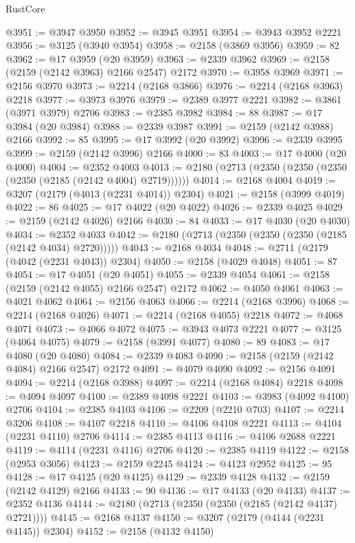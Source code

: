 \begin{lexlean}{RustCore}
\begin{coremodule}
@3951 := @3947 @3950
@3952 := @3945 @3951
@3954 := @3943 @3952 @2221
@3956 := @3125 (@3940 @3954)
@3958 := @2158 (@3869 @3956)
@3959 := 82
@3962 := @17 @3959 (@20 @3959)
@3963 := @2339 @3962
@3969 := @2158 (@2159 (@2142 @3963) @2166 @2547) @2172
@3970 := @3958 @3969
@3971 := @2156 @3970
@3973 := @2214 (@2168 @3866)
@3976 := @2214 (@2168 @3963) @2218
@3977 := @3973 @3976
@3979 := @2389 @3977 @2221
@3982 := @3861 (@3971 @3979) @2706
@3983 := @2385 @3982
@3984 := 88
@3987 := @17 @3984 (@20 @3984)
@3988 := @2339 @3987
@3991 := @2159 (@2142 @3988) @2166
@3992 := 85
@3995 := @17 @3992 (@20 @3992)
@3996 := @2339 @3995
@3999 := @2159 (@2142 @3996) @2166
@4000 := 83
@4003 := @17 @4000 (@20 @4000)
@4004 := @2352 @4003
@4013 := @2180 (@2713 (@2350 (@2350 (@2350 (@2350 (@2185 (@2142 @4004) @2719))))))
@4014 := @2168 @4004
@4019 := @3207 (@2179 (@4013 (@2231 @4014)) @2304)
@4021 := @2158 (@3999 @4019)
@4022 := 86
@4025 := @17 @4022 (@20 @4022)
@4026 := @2339 @4025
@4029 := @2159 (@2142 @4026) @2166
@4030 := 84
@4033 := @17 @4030 (@20 @4030)
@4034 := @2352 @4033
@4042 := @2180 (@2713 (@2350 (@2350 (@2350 (@2185 (@2142 @4034) @2720)))))
@4043 := @2168 @4034
@4048 := @2711 (@2179 (@4042 (@2231 @4043)) @2304)
@4050 := @2158 (@4029 @4048)
@4051 := 87
@4054 := @17 @4051 (@20 @4051)
@4055 := @2339 @4054
@4061 := @2158 (@2159 (@2142 @4055) @2166 @2547) @2172
@4062 := @4050 @4061
@4063 := @4021 @4062
@4064 := @2156 @4063
@4066 := @2214 (@2168 @3996)
@4068 := @2214 (@2168 @4026)
@4071 := @2214 (@2168 @4055) @2218
@4072 := @4068 @4071
@4073 := @4066 @4072
@4075 := @3943 @4073 @2221
@4077 := @3125 (@4064 @4075)
@4079 := @2158 (@3991 @4077)
@4080 := 89
@4083 := @17 @4080 (@20 @4080)
@4084 := @2339 @4083
@4090 := @2158 (@2159 (@2142 @4084) @2166 @2547) @2172
@4091 := @4079 @4090
@4092 := @2156 @4091
@4094 := @2214 (@2168 @3988)
@4097 := @2214 (@2168 @4084) @2218
@4098 := @4094 @4097
@4100 := @2389 @4098 @2221
@4103 := @3983 (@4092 @4100) @2706
@4104 := @2385 @4103
@4106 := @2209 (@2210 @703)
@4107 := @2214 @3206
@4108 := @4107 @2218
@4110 := @4106 @4108 @2221
@4113 := @4104 (@2231 @4110) @2706
@4114 := @2385 @4113
@4116 := @4106 @2688 @2221
@4119 := @4114 (@2231 @4116) @2706
@4120 := @2385 @4119
@4122 := @2158 (@2953 @3056)
@4123 := @2159 @2245
@4124 := @4123 @2952
@4125 := 95
@4128 := @17 @4125 (@20 @4125)
@4129 := @2339 @4128
@4132 := @2159 (@2142 @4129) @2166
@4133 := 90
@4136 := @17 @4133 (@20 @4133)
@4137 := @2352 @4136
@4144 := @2180 (@2713 (@2350 (@2350 (@2185 (@2142 @4137) @2721))))
@4145 := @2168 @4137
@4150 := @3207 (@2179 (@4144 (@2231 @4145)) @2304)
@4152 := @2158 (@4132 @4150)

\end{coremodule}
\end{lexlean}
